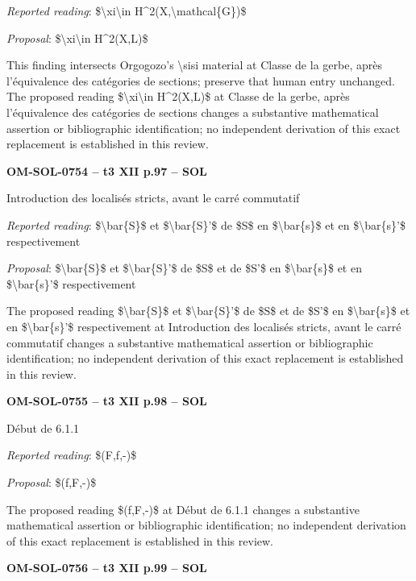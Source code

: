 \emph{Reported reading}: \$\textbackslash{}xi\textbackslash{}in H\textasciicircum{}2(X,\textbackslash{}mathcal\{G\})\$\par
\emph{Proposal}: \$\textbackslash{}xi\textbackslash{}in H\textasciicircum{}2(X,L)\$\par
This finding intersects Orgogozo's \textbackslash{}sisi material at Classe de la gerbe, après l'équivalence des catégories de sections; preserve that human entry unchanged. The proposed reading \$\textbackslash{}xi\textbackslash{}in H\textasciicircum{}2(X,L)\$ at Classe de la gerbe, après l'équivalence des catégories de sections changes a substantive mathematical assertion or bibliographic identification; no independent derivation of this exact replacement is established in this review.\par
\par\noindent\textbf{OM-SOL-0754 -- t3 XII p.97 -- SOL}\par
Introduction des localisés stricts, avant le carré commutatif\par
\emph{Reported reading}: \$\textbackslash{}bar\{S\}\$ et \$\textbackslash{}bar\{S\}'\$ de \$S\$ en \$\textbackslash{}bar\{s\}\$ et en \$\textbackslash{}bar\{s\}'\$ respectivement\par
\emph{Proposal}: \$\textbackslash{}bar\{S\}\$ et \$\textbackslash{}bar\{S\}'\$ de \$S\$ et de \$S'\$ en \$\textbackslash{}bar\{s\}\$ et en \$\textbackslash{}bar\{s\}'\$ respectivement\par
The proposed reading \$\textbackslash{}bar\{S\}\$ et \$\textbackslash{}bar\{S\}'\$ de \$S\$ et de \$S'\$ en \$\textbackslash{}bar\{s\}\$ et en \$\textbackslash{}bar\{s\}'\$ respectivement at Introduction des localisés stricts, avant le carré commutatif changes a substantive mathematical assertion or bibliographic identification; no independent derivation of this exact replacement is established in this review.\par
\par\noindent\textbf{OM-SOL-0755 -- t3 XII p.98 -- SOL}\par
Début de 6.1.1\par
\emph{Reported reading}: \$(F,f,-)\$\par
\emph{Proposal}: \$(f,F,-)\$\par
The proposed reading \$(f,F,-)\$ at Début de 6.1.1 changes a substantive mathematical assertion or bibliographic identification; no independent derivation of this exact replacement is established in this review.\par
\par\noindent\textbf{OM-SOL-0756 -- t3 XII p.99 -- SOL}\par
